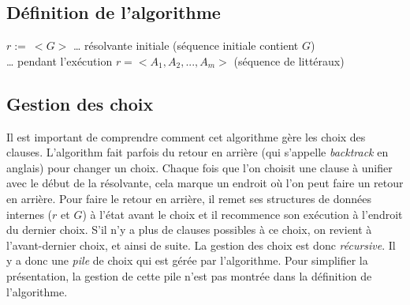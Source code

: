 \subsection{Définition de l'algorithme}

\begin{algorithm}[H]
$r :=\ <G>$ … résolvante initiale (séquence initiale contient $G$) \\
… pendant l'exécution $r= <A_{1},A_{2},...,A_{m}>$ (séquence de littéraux)\\
\end{algorithm}

\subsection{Gestion des choix}

Il est important de comprendre comment cet algorithme gère les choix des clauses.
L'algorithm fait parfois du retour en arrière (qui s'appelle {\em backtrack} en anglais) pour changer un choix.
Chaque fois que l'on choisit une clause à unifier avec le début de la résolvante,
cela marque un endroit où l'on peut faire un retour en arrière. 
Pour faire le retour en arrière,
il remet ses structures de données internes ($r$ et $G$) à l'état avant le choix
et il recommence son exécution à l'endroit du dernier choix.
S'il n'y a plus de clauses possibles à ce choix,
on revient à l'avant-dernier choix, et ainsi de suite.
La gestion des choix est donc {\em récursive}.
Il y a donc une {\em pile} de choix qui est gérée par l'algorithme.
Pour simplifier la présentation, la gestion de cette pile n'est pas montrée dans la définition de l'algorithme.


